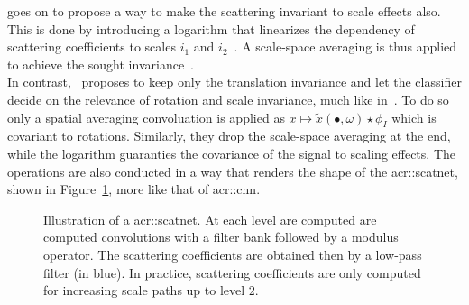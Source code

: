                     \textcite{sifre2013rotation} goes on to propose a way to make the scattering invariant to scale effects also.
                    This is done by introducing a logarithm that linearizes the dependency of scattering coefficients to scales $i_1$ and $i_2$~\parencite{sifre2013rotation,oyallon2015deep}.
                    A scale-space averaging is thus applied to achieve the sought invariance~\parencite{sifre2013rotation}.\\

                    In contrast,~\textcite{oyallon2015deep} proposes to keep only the translation invariance and let the classifier decide on the relevance of rotation and scale invariance, much like in~\parencite{cohen2016group}.
                    To do so only a spatial averaging convoluation is applied as $x \mapsto \tilde{x}(\bullet, \omega) \star \phi_I$ which is covariant to rotations.
                    Similarly, they drop the scale-space averaging at the end, while the logarithm guaranties the covariance of the signal to scaling effects.
                    The operations are also conducted in a way that renders the shape of the \gls{acr::scatnet}, shown in Figure~\ref{fig::scatnet}, more like that of \gls{acr::cnn}.

                    \begin{figure}
                        \centering
                        
                        \caption[
                            Illustration of a \acrshort*{acr::scatnet}.
                        ]{
                            \label{fig::scatnet} Illustration of a \gls{acr::scatnet}.
                            At each level are computed are computed convolutions with a filter bank followed by a modulus operator.
                            The scattering coefficients are obtained then by a low-pass filter (in blue).
                            In practice, scattering coefficients are only computed for increasing scale paths up to level $2$.
                        }
                    \end{figure}

